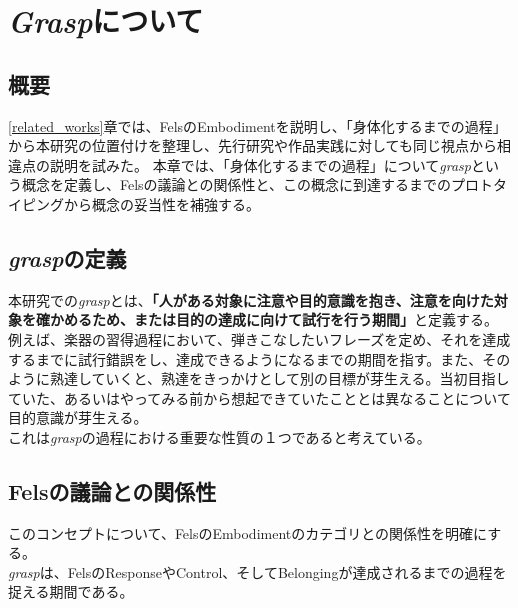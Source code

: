 \chapter{\textit{Grasp}について}
\label{graspについて}

\section{概要}
\ref{related_works}章では、FelsのEmbodimentを説明し、「身体化するまでの過程」から本研究の位置付けを整理し、先行研究や作品実践に対しても同じ視点から相違点の説明を試みた。
本章では、「身体化するまでの過程」について\textit{grasp}という概念を定義し、Felsの議論との関係性と、この概念に到達するまでのプロトタイピングから概念の妥当性を補強する。\\

\section{\textit{grasp}の定義}
本研究での\textit{grasp}とは、\textbf{「人がある対象に注意や目的意識を抱き、注意を向けた対象を確かめるため、または目的の達成に向けて試行を行う期間」}と定義する。
例えば、楽器の習得過程において、弾きこなしたいフレーズを定め、それを達成するまでに試行錯誤をし、達成できるようになるまでの期間を指す。また、そのように熟達していくと、熟達をきっかけとして別の目標が芽生える。当初目指していた、あるいはやってみる前から想起できていたこととは異なることについて目的意識が芽生える。\\
これは\textit{grasp}の過程における重要な性質の１つであると考えている。

\section{Felsの議論との関係性}
このコンセプトについて、FelsのEmbodimentのカテゴリとの関係性を明確にする。\\
\textit{grasp}は、FelsのResponseやControl、そしてBelongingが達成されるまでの過程を捉える期間である。\\

